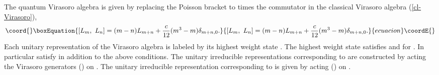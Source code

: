 \documentclass[a4paper,11pt]{article}
\begin{document}
The quantum Virasoro algebra is given by replacing the Poisson bracket 
to \coordHE{} times the commutator in the classical Virasoro algebra 
(\ref{cl-Virasoro}),
\begin{equation}\coord{}\boxEquation{
\label{quantum-Virasoro}
\left[L_m, \ L_n\right]
   =(m-n)L_{m+n}+\frac{c}{12}(m^3-m)\delta_{m+n,0}.
}{
\left[L_m, \ L_n\right]
   =(m-n)L_{m+n}+\frac{c}{12}(m^3-m)\delta_{m+n,0}.
}{ecuacion}\coordE{}\end{equation}
Each unitary representation of the Virasoro algebra is labeled by 
its highest weight state \coordHE{}.
The highest weight state satisfies 
\coordHE{} and \coordHE{} for \coordHE{}.
In particular \myHighlight{$|0\rangle$}\coordHE{} satisfy \coordHE{} in addition to 
the above conditions.
The unitary irreducible representations \coordHE{} corresponding to 
\coordHE{} are constructed 
by acting the Virasoro generators \coordHE{} (\coordHE{}) on \coordHE{}.
The unitary irreducible representation \coordHE{} corresponding 
to \coordHE{} is given by acting \coordHE{} (\coordHE{}) on \myHighlight{$|0\rangle$}\coordHE{}.
\end{document}
